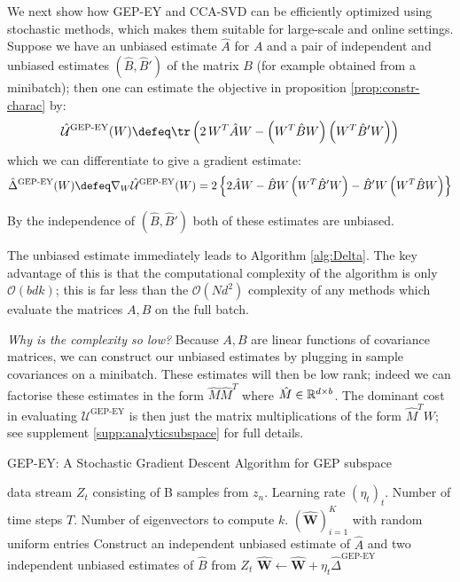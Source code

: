 We next show how GEP-EY and CCA-SVD can be efficiently optimized using stochastic methods, which makes them suitable for large-scale and online settings.
Suppose we have an unbiased estimate $\hat{A}$ for $A$ and a pair of independent and unbiased estimates $(\hat{B},\hat{B}')$ of the matrix $B$ (for example obtained from a minibatch); then one can estimate the objective in proposition \ref{prop:constr-charac} by:
\begin{align}
    \hat{\mathcal{U}}^\text{GEP-EY}(W) \defeq \tr \left( 2\, W^T \hat{A} W - \left(W^T \hat{B} W\right) \left(W^T \hat{B}' W\right) \right)
\end{align}
which we can differentiate to give a gradient estimate:
\begin{align}\label{eq:GEP-EY-grad}
    \hat{\Delta}^{\text{GEP-EY}}(W)
    \defeq \nabla_W \hat{\mathcal{U}}^\text{GEP-EY}(W)
    = 2 \left\{ 2 \hat{A} W - \hat{B} W \left(W^T \hat{B}' W \right) - \hat{B}' W \left(W^T \hat{B} W \right) \right\}
\end{align}

By the independence of $(\hat{B},\hat{B}')$ both of these estimates are unbiased.

The unbiased estimate immediately leads to Algorithm \ref{alg:Delta}.
The key advantage of this is that the computational complexity of the algorithm is only $\mathcal{O}(b d k)$; this is far less than the $\mathcal{O}(N d^2)$ complexity of any methods which evaluate the matrices $A,B$ on the full batch.

\textit{Why is the complexity so low?} Because $A,B$ are linear functions of covariance matrices, we can construct our unbiased estimates by plugging in sample covariances on a minibatch.
These estimates will then be low rank; indeed we can factorise these estimates in the form $\hat{M} \hat{M}^T$ where $\hat{M} \in \mathbb{R}^{d \times b}$. The dominant cost in evaluating $\mathcal{U}^\text{GEP-EY}$ is then just the matrix multiplications of the form $\hat{M}^T W$; see supplement \ref{supp:analyticsubspace} for full details.

\begin{algorithm}
   \caption{GEP-EY: A Stochastic Gradient Descent Algorithm for GEP subspace}
   \label{alg:Delta}
\begin{algorithmic}
    data stream $Z_t$ consisting of B samples from $z_n$. Learning rate $(\eta_t)_t$. Number of time steps $T$. Number of eigenvectors to compute $k$.
    $(\hat{\mathbf {W}})_{i=1}^K$ with random uniform entries
       \STATE Construct an independent unbiased estimate of $\hat{A}$ and two independent unbiased estimates of $\hat{B}$ from $Z_t$
        \STATE $\hat{\mathbf {W}} \leftarrow \hat{\mathbf {W}}+\eta_{t} \hat{\Delta}^{\text{GEP-EY}}$ 
   \ENDFOR
\end{algorithmic}
\end{algorithm}

